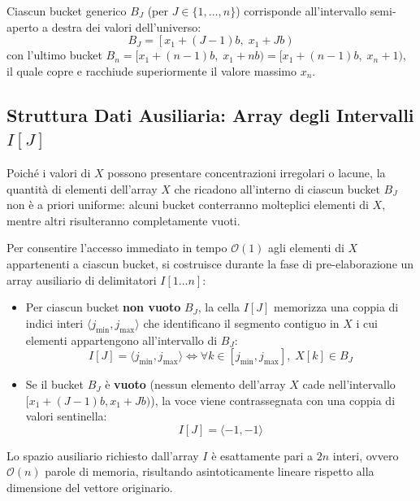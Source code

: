 Ciascun bucket generico $B_J$ (per $J \in \{1, \dots, n\}$) corrisponde all'intervallo semi-aperto a destra dei valori dell'universo:
\begin{equation}
  B_J = \left[ x_1 + (J-1)b, \; x_1 + Jb \right)
\end{equation}
con l'ultimo bucket $B_n = [x_1 + (n-1)b, \; x_1 + nb) = [x_1 + (n-1)b, \; x_n + 1)$, il quale copre e racchiude superiormente il valore massimo $x_n$.

\FloatBarrier
\subsection{Struttura Dati Ausiliaria: Array degli Intervalli $I[J]$}
\label{subsec:struttura-array-intervalli}

Poich\'e i valori di $X$ possono presentare concentrazioni irregolari o lacune, la quantit\`a di elementi dell'array $X$ che ricadono all'interno di ciascun bucket $B_J$ non \`e a priori uniforme: alcuni bucket conterranno molteplici elementi di $X$, mentre altri risulteranno completamente vuoti.

Per consentire l'accesso immediato in tempo $\mathcal{O}(1)$ agli elementi di $X$ appartenenti a ciascun bucket, si costruisce durante la fase di pre-elaborazione un array ausiliario di delimitatori $I[1 \dots n]$:
\begin{itemize}
  \item Per ciascun bucket \textbf{non vuoto} $B_J$, la cella $I[J]$ memorizza una coppia di indici interi $\langle j_{\min}, j_{\max} \rangle$ che identificano il segmento contiguo in $X$ i cui elementi appartengono all'intervallo di $B_J$:
  \begin{equation}
    I[J] = \langle j_{\min}, j_{\max} \rangle \iff \forall k \in [j_{\min}, j_{\max}], \; X[k] \in B_J
  \end{equation}
  \item Se il bucket $B_J$ \`e \textbf{vuoto} (nessun elemento dell'array $X$ cade nell'intervallo $[x_1 + (J-1)b, x_1 + Jb)$), la voce viene contrassegnata con una coppia di valori sentinella:
  \begin{equation}
    I[J] = \langle -1, -1 \rangle
  \end{equation}
\end{itemize}

Lo spazio ausiliario richiesto dall'array $I$ \`e esattamente pari a $2n$ interi, ovvero $\mathcal{O}(n)$ parole di memoria, risultando asintoticamente lineare rispetto alla dimensione del vettore originario.

